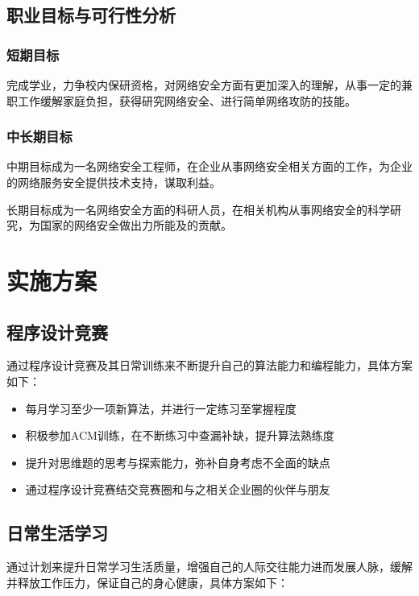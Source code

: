 \documentclass{article}
\begin{document}
\subsection{职业目标与可行性分析}

\subsubsection{短期目标}

完成学业，力争校内保研资格，对网络安全方面有更加深入的理解，从事一定的兼职工作缓解家庭负担，获得研究网络安全、进行简单网络攻防的技能。

\subsubsection{中长期目标}

中期目标成为一名网络安全工程师，在企业从事网络安全相关方面的工作，为企业的网络服务安全提供技术支持，谋取利益。

长期目标成为一名网络安全方面的科研人员，在相关机构从事网络安全的科学研究，为国家的网络安全做出力所能及的贡献。

\section{实施方案}

\subsection{程序设计竞赛}

通过程序设计竞赛及其日常训练来不断提升自己的算法能力和编程能力，具体方案如下：

\begin{itemize}
    \item 每月学习至少一项新算法，并进行一定练习至掌握程度
    \item 积极参加ACM训练，在不断练习中查漏补缺，提升算法熟练度
    \item 提升对思维题的思考与探索能力，弥补自身考虑不全面的缺点
    \item 通过程序设计竞赛结交竞赛圈和与之相关企业圈的伙伴与朋友
\end{itemize}

\subsection{日常生活学习}

通过计划来提升日常学习生活质量，增强自己的人际交往能力进而发展人脉，缓解并释放工作压力，保证自己的身心健康，具体方案如下：
\end{document}
